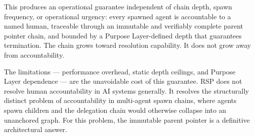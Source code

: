 This produces an operational guarantee independent of chain depth, spawn frequency, or operational urgency: every spawned agent is accountable to a named human, traceable through an immutable and verifiably complete parent pointer chain, and bounded by a Purpose Layer-defined depth that guarantees termination. The chain grows toward resolution capability. It does not grow away from accountability.

The limitations — performance overhead, static depth ceilings, and Purpose Layer dependence — are the unavoidable cost of this guarantee. RSP does not resolve human accountability in AI systems generally. It resolves the structurally distinct problem of accountability in multi-agent spawn chains, where agents spawn children and the delegation chain would otherwise collapse into an unanchored graph. For this problem, the immutable parent pointer is a definitive architectural answer.